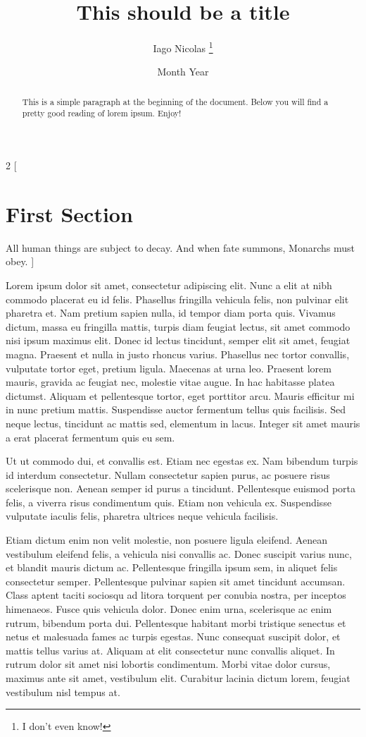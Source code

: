 \documentclass[12pt, a4paper]{article}
\title{This should be a title}
\author{Iago Nicolas \thanks{I don't even know!}}
\date{Month Year}
\begin{document}
\begin{titlepage}
\maketitle
\end{titlepage}
\begin{abstract}
    This is a simple paragraph at the beginning of the document. Below you will find
    a pretty good reading of lorem ipsum. Enjoy!
\end{abstract}
\begin{multicols}{2}
[
\section{First Section}
All human things are subject to decay. And when fate summons, Monarchs must obey.
]

Lorem ipsum dolor sit amet, consectetur adipiscing elit. Nunc a elit at nibh commodo 
placerat eu id felis. Phasellus fringilla vehicula felis, non pulvinar elit pharetra 
et. Nam pretium sapien nulla, id tempor diam porta quis. Vivamus dictum, massa eu
fringilla mattis, turpis diam feugiat lectus, sit amet commodo nisi ipsum maximus 
elit. Donec id lectus tincidunt, semper elit sit amet, feugiat magna. Praesent et 
nulla in justo rhoncus varius. Phasellus nec tortor convallis, vulputate tortor eget, 
pretium ligula. Maecenas at urna leo. Praesent lorem mauris, gravida ac feugiat nec, 
molestie vitae augue. In hac habitasse platea dictumst. Aliquam et pellentesque tortor, 
eget porttitor arcu. Mauris efficitur mi in nunc pretium mattis. Suspendisse auctor 
fermentum tellus quis facilisis. Sed neque lectus, tincidunt ac mattis sed, elementum 
in lacus. Integer sit amet mauris a erat placerat fermentum quis eu sem.

Ut ut commodo dui, et convallis est. Etiam nec egestas ex. Nam bibendum turpis id 
interdum consectetur. Nullam consectetur sapien purus, ac posuere risus scelerisque 
non. Aenean semper id purus a tincidunt. Pellentesque euismod porta felis, a viverra 
risus condimentum quis. Etiam non vehicula ex. Suspendisse vulputate iaculis felis, 
pharetra ultrices neque vehicula facilisis.

Etiam dictum enim non velit molestie, non posuere ligula eleifend. Aenean vestibulum 
eleifend felis, a vehicula nisi convallis ac. Donec suscipit varius nunc, et blandit 
mauris dictum ac. Pellentesque fringilla ipsum sem, in aliquet felis consectetur semper. 
Pellentesque pulvinar sapien sit amet tincidunt accumsan. Class aptent taciti sociosqu 
ad litora torquent per conubia nostra, per inceptos himenaeos. Fusce quis vehicula dolor.
Donec enim urna, scelerisque ac enim rutrum, bibendum porta dui. Pellentesque habitant 
morbi tristique senectus et netus et malesuada fames ac turpis egestas. Nunc consequat 
suscipit dolor, et mattis tellus varius at. Aliquam at elit consectetur nunc convallis 
aliquet. In rutrum dolor sit amet nisi lobortis condimentum. Morbi vitae dolor cursus, 
maximus ante sit amet, vestibulum elit. Curabitur lacinia dictum lorem, feugiat 
vestibulum nisl tempus at.

\end{multicols}
\end{document}
